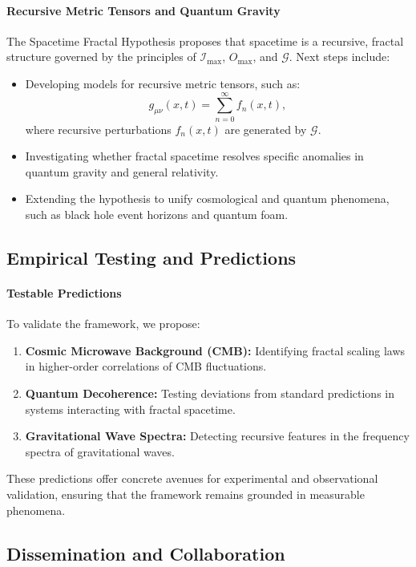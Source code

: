 \documentclass[12pt]{article}
\begin{document}
\paragraph{Recursive Metric Tensors and Quantum Gravity}
The Spacetime Fractal Hypothesis proposes that spacetime is a recursive, fractal structure governed by the principles of \(\mathcal{I}_{\text{max}}\), \(O_{\text{max}}\), and \(\mathcal{G}\). Next steps include:
\begin{itemize}
    \item Developing models for recursive metric tensors, such as:
    \[
    g_{\mu\nu}(x, t) = \sum_{n=0}^\infty f_n(x, t),
    \]
    where recursive perturbations \(f_n(x, t)\) are generated by \(\mathcal{G}\).
    \item Investigating whether fractal spacetime resolves specific anomalies in quantum gravity and general relativity.
    \item Extending the hypothesis to unify cosmological and quantum phenomena, such as black hole event horizons and quantum foam.
\end{itemize}

\subsection{Empirical Testing and Predictions}

\paragraph{Testable Predictions}
To validate the framework, we propose:
\begin{enumerate}
    \item \textbf{Cosmic Microwave Background (CMB):} Identifying fractal scaling laws in higher-order correlations of CMB fluctuations.
    \item \textbf{Quantum Decoherence:} Testing deviations from standard predictions in systems interacting with fractal spacetime.
    \item \textbf{Gravitational Wave Spectra:} Detecting recursive features in the frequency spectra of gravitational waves.
\end{enumerate}
These predictions offer concrete avenues for experimental and observational validation, ensuring that the framework remains grounded in measurable phenomena.

\subsection{Dissemination and Collaboration}
\end{document}
